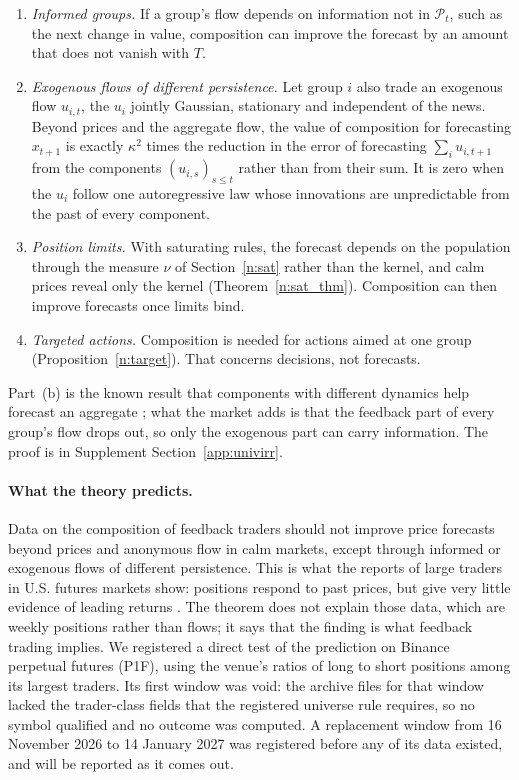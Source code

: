 \begin{proposition}\label{n:exc}
\begin{enumerate}[label=(\alph*),itemsep=1pt]
\item \emph{Informed groups.} If a group's flow depends on information not in $\mathcal P_t$, such as the next change in value, composition can improve the forecast by an amount that does not vanish with $T$.
\item \emph{Exogenous flows of different persistence.} Let group $i$ also trade an exogenous flow $u_{i,t}$, the $u_i$ jointly Gaussian, stationary and independent of the news. Beyond prices and the aggregate flow, the value of composition for forecasting $x_{t+1}$ is exactly $\kappa^2$ times the reduction in the error of forecasting $\sum_iu_{i,t+1}$ from the components $(u_{i,s})_{s\le t}$ rather than from their sum. It is zero when the $u_i$ follow one autoregressive law whose innovations are unpredictable from the past of every component.
\item \emph{Position limits.} With saturating rules, the forecast depends on the population through the measure $\nu$ of Section~\ref{n:sat} rather than the kernel, and calm prices reveal only the kernel (Theorem~\ref{n:sat_thm}). Composition can then improve forecasts once limits bind.
\item \emph{Targeted actions.} Composition is needed for actions aimed at one group (Proposition~\ref{n:target}). That concerns decisions, not forecasts.
\end{enumerate}
\end{proposition}

Part~(b) is the known result that components with different dynamics help forecast an aggregate \citep{lutkepohl1987,hendry2011}; what the market adds is that the feedback part of every group's flow drops out, so only the exogenous part can carry information. The proof is in Supplement Section~\ref{app:univirr}.

\paragraph{What the theory predicts.} Data on the composition of feedback traders should not improve price forecasts beyond prices and anonymous flow in calm markets, except through informed or exogenous flows of different persistence. This is what the reports of large traders in U.S. futures markets show: positions respond to past prices, but give very little evidence of leading returns \citep{sanders2009}. The theorem does not explain those data, which are weekly positions rather than flows; it says that the finding is what feedback trading implies. We registered a direct test of the prediction on Binance perpetual futures (P1F), using the venue's ratios of long to short positions among its largest traders. Its first window was void: the archive files for that window lacked the trader-class fields that the registered universe rule requires, so no symbol qualified and no outcome was computed. A replacement window from 16 November 2026 to 14 January 2027 was registered before any of its data existed, and will be reported as it comes out.

